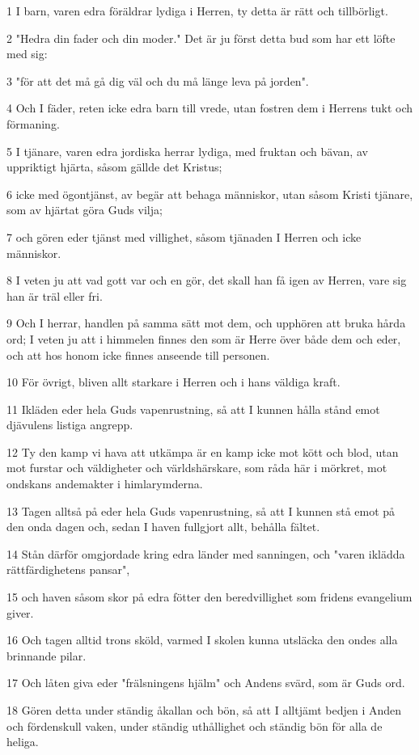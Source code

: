 \par 1 I barn, varen edra föräldrar lydiga i Herren, ty detta är rätt och tillbörligt.
\par 2 "Hedra din fader och din moder." Det är ju först detta bud som har ett löfte med sig:
\par 3 "för att det må gå dig väl och du må länge leva på jorden".
\par 4 Och I fäder, reten icke edra barn till vrede, utan fostren dem i Herrens tukt och förmaning.
\par 5 I tjänare, varen edra jordiska herrar lydiga, med fruktan och bävan, av uppriktigt hjärta, såsom gällde det Kristus;
\par 6 icke med ögontjänst, av begär att behaga människor, utan såsom Kristi tjänare, som av hjärtat göra Guds vilja;
\par 7 och gören eder tjänst med villighet, såsom tjänaden I Herren och icke människor.
\par 8 I veten ju att vad gott var och en gör, det skall han få igen av Herren, vare sig han är träl eller fri.
\par 9 Och I herrar, handlen på samma sätt mot dem, och upphören att bruka hårda ord; I veten ju att i himmelen finnes den som är Herre över både dem och eder, och att hos honom icke finnes anseende till personen.
\par 10 För övrigt, bliven allt starkare i Herren och i hans väldiga kraft.
\par 11 Ikläden eder hela Guds vapenrustning, så att I kunnen hålla stånd emot djävulens listiga angrepp.
\par 12 Ty den kamp vi hava att utkämpa är en kamp icke mot kött och blod, utan mot furstar och väldigheter och världshärskare, som råda här i mörkret, mot ondskans andemakter i himlarymderna.
\par 13 Tagen alltså på eder hela Guds vapenrustning, så att I kunnen stå emot på den onda dagen och, sedan I haven fullgjort allt, behålla fältet.
\par 14 Stån därför omgjordade kring edra länder med sanningen, och "varen iklädda rättfärdighetens pansar",
\par 15 och haven såsom skor på edra fötter den beredvillighet som fridens evangelium giver.
\par 16 Och tagen alltid trons sköld, varmed I skolen kunna utsläcka den ondes alla brinnande pilar.
\par 17 Och låten giva eder "frälsningens hjälm" och Andens svärd, som är Guds ord.
\par 18 Gören detta under ständig åkallan och bön, så att I alltjämt bedjen i Anden och fördenskull vaken, under ständig uthållighet och ständig bön för alla de heliga.
